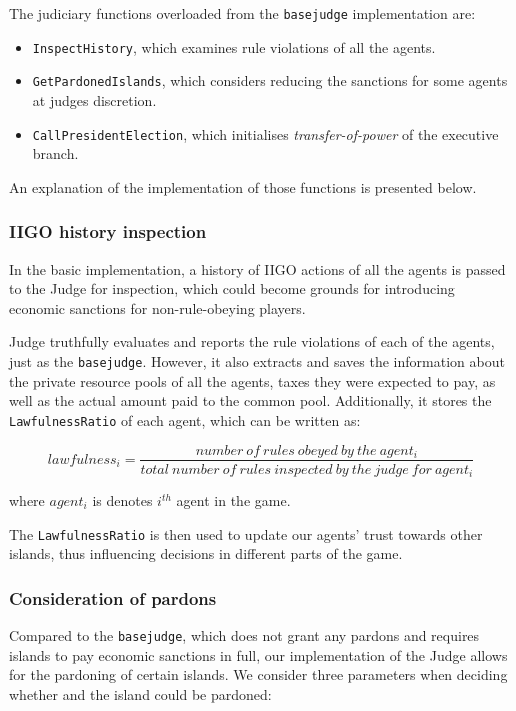 The judiciary functions overloaded from the \texttt{basejudge} implementation are:
\begin{itemize}
    \item \texttt{InspectHistory}, which examines rule violations of all the agents.
    \item \texttt{GetPardonedIslands}, which considers reducing the sanctions for some agents at judges discretion.
    \item \texttt{CallPresidentElection}, which initialises \emph{transfer-of-power} of the executive branch.
\end{itemize}
An explanation of the implementation of those functions is presented below.

\subsubsection{IIGO history inspection}
\label{subsubsec:team4:judge:inspect_history}
In the basic implementation, a history of IIGO actions of all the agents is passed to the Judge for inspection, which could become grounds for introducing economic sanctions for non-rule-obeying players. 

Judge truthfully evaluates and reports the rule violations of each of the agents, just as the \texttt{basejudge}. However, it also extracts and saves the information about the private resource pools of all the agents, taxes they were expected to pay, as well as the actual amount paid to the common pool. Additionally, it stores the \texttt{LawfulnessRatio} of each agent, which can be written as:


\begin{equation}
    lawfulness_{i} = \frac{number\:of\:rules\:obeyed\:by\:the\:agent_{i}}{total\:number\:of\:rules\:inspected\:by\:the\:judge\:for\:agent_{i}}
\end{equation}

where $agent_{i}$ is denotes $i^{th}$ agent in the game.  

The \texttt{LawfulnessRatio} is then used to update our agents' trust towards other islands, thus influencing decisions in different parts of the game. 

\subsubsection{Consideration of pardons}
Compared to the \texttt{basejudge}, which does not grant any pardons and requires islands to pay economic sanctions in full, our implementation of the Judge allows for the pardoning of certain islands. We consider three parameters when deciding whether and the island could be pardoned:

